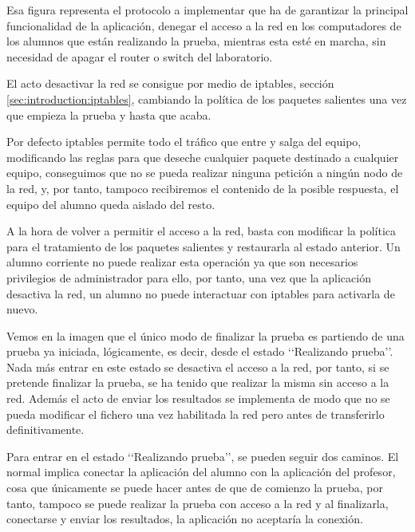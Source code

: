 Esa figura representa el protocolo a implementar que ha de garantizar la principal funcionalidad de la aplicación, denegar el acceso a la red en los computadores de los alumnos que están realizando la prueba, mientras esta esté en marcha, sin necesidad de apagar el router o switch del laboratorio.
\newline



El acto desactivar la red se consigue por medio de iptables, sección \ref{sec:introduction:iptables}, cambiando la política de los paquetes salientes una vez que empieza la prueba y hasta que acaba.
\newline

Por defecto iptables permite todo el tráfico que entre y salga del equipo, modificando las reglas para que deseche cualquier paquete destinado a cualquier equipo, conseguimos que no se pueda realizar ninguna petición a ningún nodo de la red, y, por tanto, tampoco recibiremos el contenido de la posible respuesta, el equipo del alumno queda aislado del resto.
\newline

A la hora de volver a permitir el acceso a la red, basta con modificar la política para el tratamiento de los paquetes salientes y restaurarla al estado anterior. Un alumno corriente no puede realizar esta operación ya que son necesarios privilegios de administrador para ello, por tanto, una vez que la aplicación desactiva la red, un alumno no puede interactuar con iptables para activarla de nuevo.
\newline


Vemos en la imagen que el único modo de finalizar la prueba es partiendo de una prueba ya iniciada, lógicamente, es decir, desde el estado \lq\lq Realizando prueba\rq\rq. Nada más entrar en este estado se desactiva el acceso a la red, por tanto, si se pretende finalizar la prueba, se ha tenido que realizar la misma sin acceso a la red. Además el acto de enviar los resultados se implementa de modo que no se pueda modificar el fichero una vez habilitada la red pero antes de transferirlo definitivamente.
\newline

Para entrar en el estado \lq\lq Realizando prueba\rq\rq, se pueden seguir dos caminos. El normal implica conectar la aplicación del alumno con la aplicación del profesor, cosa que únicamente se puede hacer antes de que de comienzo la prueba, por tanto, tampoco se puede realizar la prueba con acceso a la red y al finalizarla, conectarse y enviar los resultados, la aplicación no aceptaría la conexión.
\newline

